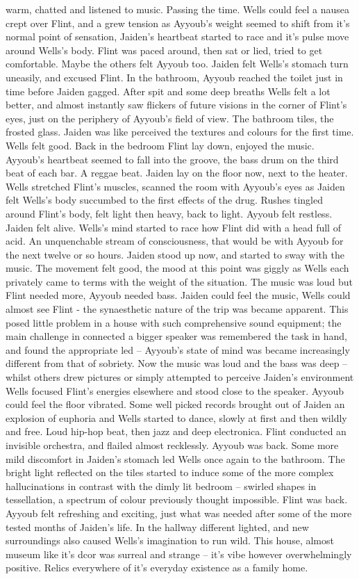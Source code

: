 \documentclass[12pt]{book}
\begin{document}
warm, chatted and listened to music. Passing the time. Wells could feel a nausea crept over Flint, and a grew tension as Ayyoub's weight seemed to shift from it's normal point of sensation, Jaiden's heartbeat started to race and it's pulse move around Wells's body. Flint was paced around, then sat or lied, tried to get comfortable. Maybe the others felt Ayyoub too. Jaiden felt Wells's stomach turn uneasily, and excused Flint. In the bathroom, Ayyoub reached the toilet just in time before Jaiden gagged. After spit and some deep breaths Wells felt a lot better, and almost instantly saw flickers of future visions in the corner of Flint's eyes, just on the periphery of Ayyoub's field of view. The bathroom tiles, the frosted glass. Jaiden was like perceived the textures and colours for the first time. Wells felt good. Back in the bedroom Flint lay down, enjoyed the music. Ayyoub's heartbeat seemed to fall into the groove, the bass drum on the third beat of each bar. A reggae beat. Jaiden lay on the floor now, next to the heater. Wells stretched Flint's muscles, scanned the room with Ayyoub's eyes as Jaiden felt Wells's body succumbed to the first effects of the drug. Rushes tingled around Flint's body, felt light then heavy, back to light. Ayyoub felt restless. Jaiden felt alive. Wells's mind started to race how Flint did with a head full of acid. An unquenchable stream of consciousness, that would be with Ayyoub for the next twelve or so hours. Jaiden stood up now, and started to sway with the music. The movement felt good, the mood at this point was giggly as Wells each privately came to terms with the weight of the situation. The music was loud but Flint needed more, Ayyoub needed bass. Jaiden could feel the music, Wells could almost see Flint - the synaesthetic nature of the trip was became apparent. This posed little problem in a house with such comprehensive sound equipment; the main challenge in connected a bigger speaker was remembered the task in hand, and found the appropriate led -- Ayyoub's state of mind was became increasingly different from that of sobriety. Now the music was loud and the bass was deep -- whilst others drew pictures or simply attempted to perceive Jaiden's environment Wells focused Flint's energies elsewhere and stood close to the speaker. Ayyoub could feel the floor vibrated. Some well picked records brought out of Jaiden an explosion of euphoria and Wells started to dance, slowly at first and then wildly and free. Loud hip-hop beat, then jazz and deep electronica. Flint conducted an invisible orchestra, and flailed almost recklessly. Ayyoub was back. Some more mild discomfort in Jaiden's stomach led Wells once again to the bathroom. The bright light reflected on the tiles started to induce some of the more complex hallucinations in contrast with the dimly lit bedroom -- swirled shapes in tessellation, a spectrum of colour previously thought impossible. Flint was back. Ayyoub felt refreshing and exciting, just what was needed after some of the more tested months of Jaiden's life. In the hallway different lighted, and new surroundings also caused Wells's imagination to run wild. This house, almost museum like it's dcor was surreal and strange -- it's vibe however overwhelmingly positive. Relics everywhere of it's everyday existence as a family home. 
\end{document}

